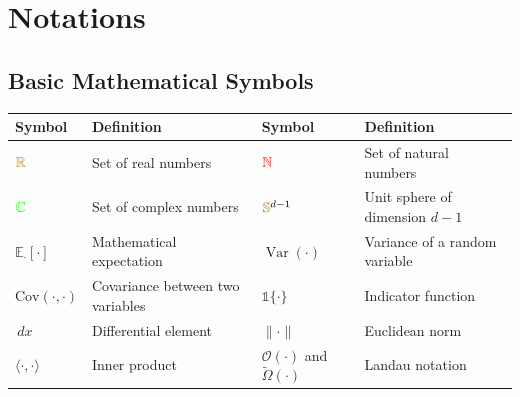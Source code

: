\documentclass[a4paper]{article}
\newcommand{\Cov}{\text{Cov}}
\newcommand{\E}{\mathbb{E}}
\DeclareMathOperator{\Var}{Var}
\newcommand{\indic}{\mathbb{1}}
\newcommand{\dd}{\,d}
\theoremstyle{plain}
\theoremstyle{definition}
\theoremstyle{remark}
\newcommand{\E}{\mathbb{E}}
\DeclareMathOperator{\Var}{Var}
\newcommand{\indic}{\mathbb{1}}
\newcommand{\dd}{\,d}
\begin{document}
\newpage












\newpage
{}
\section*{Notations}

\begin{tcolorbox}[colback=blue!5,colframe=blue!50!black,title={\large \textbf{Mathematical Notation Reference}},enhanced,drop shadow]

\subsection*{Basic Mathematical Symbols}
\begin{longtable}{p{}p{}p{}p{}}
\toprule
\textbf{Symbol} & \textbf{Definition} & \textbf{Symbol} & \textbf{Definition} \\
\midrule
$\textcolor{darkyellow}{\mathbb{R}}$ & Set of real numbers & $\textcolor{red}{\mathbb{N}}$ & Set of natural numbers \\
$\textcolor{green}{\mathbb{C}}$ & Set of complex numbers & $\textcolor{darkyellow}{\mathbb{S}}^{d-1}$ & Unit sphere of dimension $d-1$ \\
$\E_{\cdot}[\cdot]$ & Mathematical expectation & $\Var(\cdot)$ & Variance of a random variable \\
${\Cov}(\cdot,\cdot)$ & Covariance between two variables & $\indic\{\cdot\}$ & Indicator function \\
$\dd x$ & Differential element & $\|\cdot\|$ & Euclidean norm \\
$\langle \cdot,\cdot \rangle$ & Inner product & $\mathcal{O}(\cdot)$ and $\tilde{\Omega}(\cdot)$  & Landau notation \\
\bottomrule
\end{longtable}

\end{tcolorbox}
\end{document}

